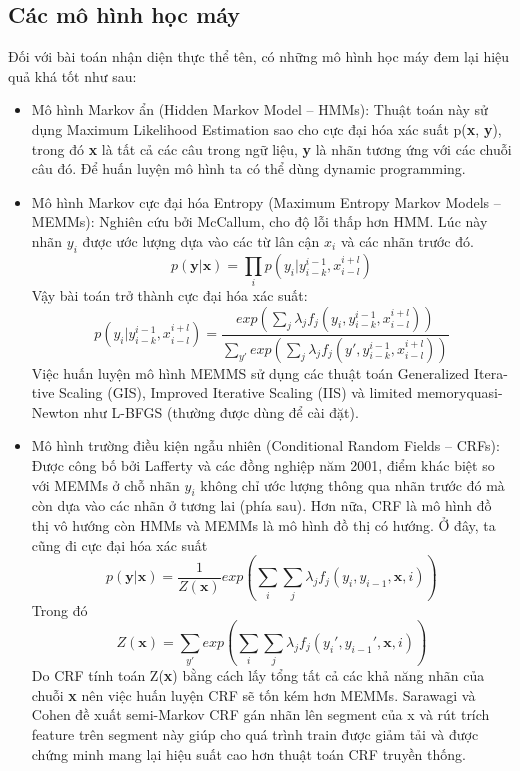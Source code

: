 \documentclass[14pt]{extreport}
\begin{document}
\subsection{Các mô hình học máy}
Đối với bài toán nhận diện thực thể tên, có những mô hình học máy đem lại hiệu quả khá tốt như sau:
\begin{itemize}
\item Mô hình Markov ẩn (Hidden Markov Model – HMMs): Thuật toán này sử dụng Maximum Likelihood Estimation sao cho cực đại hóa xác suất p(\textbf{x}, \textbf{y}), trong đó \textbf{x} là tất cả các câu trong ngữ liệu, \textbf{y} là nhãn tương ứng với các chuỗi câu đó. Để huấn luyện mô hình ta có thể dùng dynamic programming.
\item Mô hình Markov cực đại hóa Entropy (Maximum Entropy Markov Models – MEMMs): Nghiên cứu bởi McCallum, cho độ lỗi thấp hơn HMM. Lúc này nhãn $y_i$ được ước lượng dựa vào các từ lân cận $x_i$ và các nhãn trước đó. 
$$ p(\textbf{y}|\textbf{x}) = \prod_i{p(y_i|y_{i-k}^{i-1}, x_{i-l}^{i+l})}$$ 
Vậy bài toán trở thành cực đại hóa xác suất: 
$$p(y_i|y_{i-k}^{i-1}, x_{i-l}^{i+l}) = \frac{exp \left(\sum_j \lambda_j f_j \left( y_i,y_{i-k}^{i-1}, x_{i-l}^{i+l} \right) \right)}{\sum_{y'}exp \left( \sum_j \lambda_j f_j \left( y',y_{i-k}^{i-1}, x_{i-l}^{i+l} \right) \right)}$$ 
Việc huấn luyện mô hình MEMMS sử dụng các thuật toán Generalized Itera-tive Scaling (GIS), Improved Iterative Scaling (IIS) và limited memoryquasi-Newton như L-BFGS (thường được dùng để cài đặt).
\item Mô hình trường điều kiện ngẫu nhiên (Conditional Random Fields – CRFs): Được công bố bởi Lafferty và các đồng nghiệp năm 2001, điểm khác biệt so với MEMMs ở chỗ nhãn $y_i$ không chỉ ước lượng thông qua nhãn trước đó mà còn dựa vào các nhãn ở tương lai (phía sau). Hơn nữa, CRF là mô hình đồ thị vô hướng còn HMMs và MEMMs là mô hình đồ thị có hướng. Ở đây, ta cũng đi cực đại hóa xác suất \[p(\textbf{y}|\textbf{x}) = \frac{1}{Z(\textbf{x})} exp \left(\sum_i \sum_j \lambda_j f_j \left(y_i, y_{i-1}, \textbf{x}, i \right) \right)\] Trong đó \[Z(\textbf{x}) = \sum_{y'} exp \left(\sum_i \sum_j \lambda_j f_j \left(y_i', y_{i-1}', \textbf{x}, i \right) \right)\] Do CRF tính toán Z(\textbf{x}) bằng cách lấy tổng tất cả các khả năng nhãn của chuỗi \textbf{x} nên việc huấn luyện CRF sẽ tốn kém hơn MEMMs. Sarawagi và Cohen đề xuất semi-Markov CRF gán nhãn lên segment của x và rút trích feature trên segment này giúp cho quá trình train được giảm tải và được chứng minh mang lại hiệu suất cao hơn thuật toán CRF truyền thống.
\end{itemize}
\end{document}
